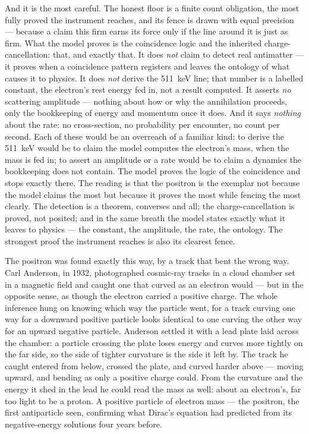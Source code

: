 And it is the most careful. The honest floor is a finite count obligation, the most fully proved the instrument reaches,
and its fence is drawn with equal precision --- because a claim this firm earns its force only if the line
around it is just as firm. What the model proves is the coincidence logic and the inherited charge-cancellation:
that, and exactly that. It does \emph{not} claim to detect real antimatter --- it proves when a coincidence
pattern registers and leaves the ontology of what causes it to physics. It does \emph{not} derive the 511~keV
line; that number is a labelled constant, the electron's rest energy fed in, not a result computed. It asserts
\emph{no} scattering amplitude --- nothing about how or why the annihilation proceeds, only the bookkeeping of
energy and momentum once it does. And it says \emph{nothing} about the rate: no cross-section, no probability
per encounter, no count per second. Each of these would be an overreach of a familiar kind: to derive the
511~keV would be to claim the model computes the electron's mass, when the mass is fed in; to assert an
amplitude or a rate would be to claim a dynamics the bookkeeping does not contain. The model proves the logic
of the coincidence and stops exactly there. The reading is that the positron is the exemplar not because the
model claims the most but because it proves the most while fencing the most clearly. The detection is a theorem,
converses and all; the charge-cancellation is proved, not posited; and in the same breath the model states
exactly what it leaves to physics --- the constant, the amplitude, the rate, the ontology. The strongest proof
the instrument reaches is also its clearest fence.

The positron was found exactly this way, by a track that bent the wrong way. Carl Anderson, in 1932,
photographed cosmic-ray tracks in a cloud chamber set in a magnetic field and caught one that curved as an
electron would --- but in the opposite sense, as though the electron carried a positive charge. The whole
inference hung on knowing which way the particle went, for a track curving one way for a downward positive
particle looks identical to one curving the other way for an upward negative particle. Anderson settled it with
a lead plate laid across the chamber: a particle crossing the plate loses energy and curves more tightly on the
far side, so the side of tighter curvature is the side it left by. The track he caught entered from below,
crossed the plate, and curved harder above --- moving upward, and bending as only a positive charge could. From
the curvature and the energy it shed in the lead he could read the mass as well: about an electron's, far too
light to be a proton. A positive particle of electron mass --- the positron, the first antiparticle seen,
confirming what Dirac's equation had predicted from its negative-energy solutions four years before.

